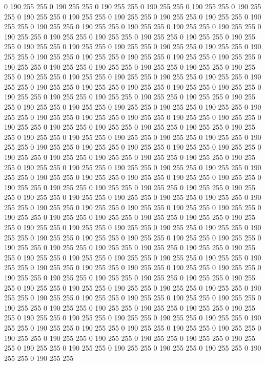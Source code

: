 0 190 255 255 0 190 255 255 0 190 255 255 0 190 255 255 0 190 255 255 0 190 255 255 0 190 255 255 0 190 255 255 0 190 255 255 0 190 255 255 0 190 255 255 0 190 255 255 0 190 255 255 0 190 255 255 0 190 255 255 0 190 255 255 0 190 255 255 0 190 255 255 0 190 255 255 0 190 255 255 0 190 255 255 0 190 255 255 0 190 255 255 0 190 255 255 0 190 255 255 0 190 255 255 0 190 255 255 0 190 255 255 0 190 255 255 0 190 255 255 0 190 255 255 0 190 255 255 0 190 255 255 0 190 255 255 0 190 255 255 0 190 255 255 0 190 255 255 0 190 255 255 0 190 255 255 0 190 255 255 0 190 255 255 0 190 255 255 0 190 255 255 0 190 255 255 0 190 255 255 0 190 255 255 0 190 255 255 0 190 255 255 0 190 255 255 0 190 255 255 
0 190 255 255 0 190 255 255 0 190 255 255 0 190 255 255 0 190 255 255 0 190 255 255 0 190 255 255 0 190 255 255 0 190 255 255 0 190 255 255 0 190 255 255 0 190 255 255 0 190 255 255 0 190 255 255 0 190 255 255 0 190 255 255 0 190 255 255 0 190 255 255 0 190 255 255 0 190 255 255 0 190 255 255 0 190 255 255 0 190 255 255 0 190 255 255 0 190 255 255 0 190 255 255 0 190 255 255 0 190 255 255 0 190 255 255 0 190 255 255 0 190 255 255 0 190 255 255 0 190 255 255 0 190 255 255 0 190 255 255 0 190 255 255 0 190 255 255 0 190 255 255 0 190 255 255 0 190 255 255 0 190 255 255 0 190 255 255 0 190 255 255 0 190 255 255 0 190 255 255 0 190 255 255 0 190 255 255 0 190 255 255 0 190 255 255 0 190 255 255 
0 190 255 255 0 190 255 255 0 190 255 255 0 190 255 255 0 190 255 255 0 190 255 255 0 190 255 255 0 190 255 255 0 190 255 255 0 190 255 255 0 190 255 255 0 190 255 255 0 190 255 255 0 190 255 255 0 190 255 255 0 190 255 255 0 190 255 255 0 190 255 255 0 190 255 255 0 190 255 255 0 190 255 255 0 190 255 255 0 190 255 255 0 190 255 255 0 190 255 255 0 190 255 255 0 190 255 255 0 190 255 255 0 190 255 255 0 190 255 255 0 190 255 255 0 190 255 255 0 190 255 255 0 190 255 255 0 190 255 255 0 190 255 255 0 190 255 255 0 190 255 255 0 190 255 255 0 190 255 255 0 190 255 255 0 190 255 255 0 190 255 255 0 190 255 255 0 190 255 255 0 190 255 255 0 190 255 255 0 190 255 255 0 190 255 255 0 190 255 255 
0 190 255 255 0 190 255 255 0 190 255 255 0 190 255 255 0 190 255 255 0 190 255 255 0 190 255 255 0 190 255 255 0 190 255 255 0 190 255 255 0 190 255 255 0 190 255 255 0 190 255 255 0 190 255 255 0 190 255 255 0 190 255 255 0 190 255 255 0 190 255 255 0 190 255 255 0 190 255 255 0 190 255 255 0 190 255 255 0 190 255 255 0 190 255 255 0 190 255 255 0 190 255 255 0 190 255 255 0 190 255 255 0 190 255 255 0 190 255 255 0 190 255 255 0 190 255 255 0 190 255 255 0 190 255 255 0 190 255 255 0 190 255 255 0 190 255 255 0 190 255 255 0 190 255 255 0 190 255 255 0 190 255 255 0 190 255 255 0 190 255 255 0 190 255 255 0 190 255 255 0 190 255 255 0 190 255 255 0 190 255 255 0 190 255 255 0 190 255 255 
